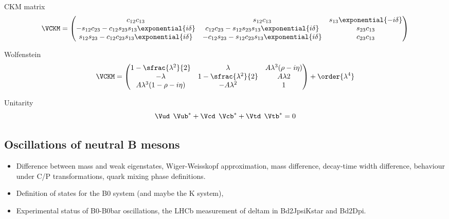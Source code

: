 CKM matrix
\begin{equation}
  \VCKM = \begin{pmatrix}
    c_{12} c_{13}                                                   & s_{12} c_{13}                                                 & s_{13} \exponential{-i\delta} \\
    -s_{12} c_{23} - c_{12} s_{23} s_{13} \exponential{i\delta}     & c_{12} c_{23} - s_{12} s_{23} s_{13} \exponential{i\delta}    & s_{23} c_{13}                 \\
    s_{12} s_{23} - c_{12} c_{23} s_{13} \exponential{i\delta}      & -c_{12} s_{23} - s_{12} c_{23} s_{13} \exponential{i\delta}   & c_{23} c_{13}                 \\
  \end{pmatrix}
\end{equation}

Wolfenstein
\begin{equation}  
  \VCKM = \begin{pmatrix}
    1 - \sfrac{\lambda^2}{2}        & \lambda                     & A \lambda^3 (\rho - i\eta)  \\
    -\lambda                        & 1 - \sfrac{\lambda^2}{2}    & A \lambda  2                \\
    A \lambda^3 (1 - \rho - i\eta)  & - A \lambda^2               & 1                           \\
  \end{pmatrix}
  + \order{\lambda^4}
\end{equation}


Unitarity
\begin{equation}
  \Vud^{\phantom{*}}\Vub^{*} + \Vcd^{\phantom{*}}\Vcb^{*} + \Vtd^{\phantom{*}}\Vtb^{*} = 0 
\end{equation}



\clearpage
\subsection{Oscillations of neutral B mesons}
\begin{itemize}
  \item Difference between mass and weak eigenstates, Wiger-Weisskopf approximation, mass difference, decay-time width difference, behaviour under C/P transformations, quark mixing phase definitions.
  \item Definition of states for the B0 system (and maybe the K system), 
  \item Experimental status of B0-B0bar oscillations, the LHCb measurement of deltam in Bd2JpsiKstar and Bd2Dpi.
\end{itemize}

